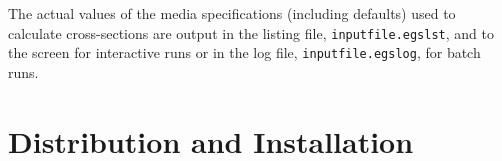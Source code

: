 \documentclass[12pt,twoside]{article}
\begin{document}
The actual values of the media specifications (including defaults) used to calculate cross-sections are
output in the listing file, {\tt inputfile.egslst}, and to the screen for interactive runs or in the
log file, {\tt inputfile.egslog}, for batch runs.

\section{Distribution and Installation}
\renewcommand{\rightmark}{Distribution and Installation}
\label{installbeam}

\end{document}
